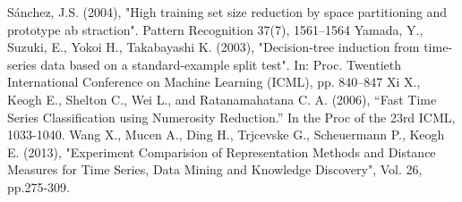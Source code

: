 \documentclass[13pt,oneside]{scrbook}
\begin{document}
\begin{spacing}{1.0}
\begin{thebibliography}{99}
\label{RSP} Sánchez, J.S. (2004), "High training set size reduction by space partitioning and prototype ab straction". Pattern Recognition 37(7), 1561–1564
\label{Decision tree} Yamada, Y., Suzuki, E., Yokoi H., Takabayashi K. (2003),
"Decision-tree induction from time-series data based on a standard-example split test". In: Proc. Twentieth International Conference on Machine Learning (ICML), pp. 840–847
\label{Xi} Xi X., Keogh E., Shelton C., Wei L., and Ratanamahatana C. A. 
(2006), “Fast Time Series
Classification using Numerosity Reduction.” In the Proc of the 23rd ICML, 1033-1040.
\label{DMKSWang}Wang X., Mucen A., Ding H., Trjcevske G., Scheuermann P., Keogh E. (2013), "Experiment Comparision of Representation Methods and Distance Measures for Time Series, Data Mining and Knowledge Discovery", Vol. 26, pp.275-309.

\end{thebibliography}
\end{spacing}
\end{document}
